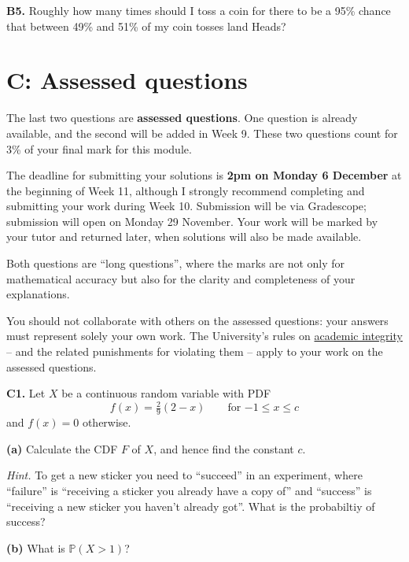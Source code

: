 \documentclass[
  a4paper,
]{book}
\theoremstyle{definition}
\theoremstyle{definition}
\theoremstyle{definition}
\theoremstyle{definition}
\theoremstyle{remark}
\begin{document}
\textbf{B5.} Roughly how many times should I toss a coin for there to be a 95\% chance that between 49\% and 51\% of my coin tosses land Heads?

\hypertarget{P5-assessed}{%
\section*{C: Assessed questions}\label{P5-assessed}}

The last two questions are \textbf{assessed questions}. One question is already available, and the second will be added in Week 9. These two questions count for 3\% of your final mark for this module.

The deadline for submitting your solutions is \textbf{2pm on Monday 6 December} at the beginning of Week 11, although I strongly recommend completing and submitting your work during Week 10. Submission will be via Gradescope; submission will open on Monday 29 November.
Your work will be marked by your tutor and returned later, when solutions will also be made available.

Both questions are ``long questions'', where the marks are not only for mathematical accuracy but also for the clarity and completeness of your explanations.

You should not collaborate with others on the assessed questions: your answers must represent solely your own work. The University's rules on \href{https://library.leeds.ac.uk/info/1401/academic_skills/46/academic_integrity_and_plagiarism}{academic integrity} -- and the related punishments for violating them -- apply to your work on the assessed questions.

\textbf{C1.} Let \(X\) be a continuous random variable with PDF
\[ f(x) = \tfrac29 (2 − x) \qquad \text{for $-1 \leq x \leq c$} \]
and \(f(x) = 0\) otherwise.

\textbf{(a)} Calculate the CDF \(F\) of \(X\), and hence find the constant \(c\).

\begin{myanswers}
\emph{Hint.} To get a new sticker you need to ``succeed'' in an experiment, where ``failure'' is ``receiving a sticker you already have a copy of'' and ``success'' is ``receiving a new sticker you haven't already got''. What is the probabiltiy of success?

\end{myanswers}

\textbf{(b)}
What is \(\mathbb P(X > 1)\)?
\end{document}

